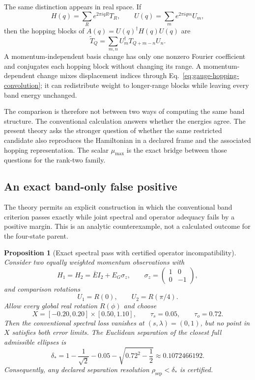 \documentclass[11pt]{article}
\newtheorem{proposition}[theorem]{Proposition}
\begin{document}
The same distinction appears in real space. If
\[
 H(q)=\sum_R e^{2\pi iqR}T_R,
 \qquad
 U(q)=\sum_m e^{2\pi iqm}U_m,
\]
then the hopping blocks of $A(q)=U(q)^\dagger H(q)U(q)$ are
\begin{equation}
 \widetilde T_Q=
 \sum_{m,n}U_m^\dagger T_{Q+m-n}U_n.
 \label{eq:gauge-hopping-convolution}
\end{equation}
A momentum-independent basis change has only one nonzero Fourier coefficient and
conjugates each hopping block without changing its range. A momentum-dependent change
mixes displacement indices through Eq.~\eqref{eq:gauge-hopping-convolution}; it can
redistribute weight to longer-range blocks while leaving every band energy unchanged.

The comparison is therefore not between two ways of computing the same band structure.
The conventional calculation answers whether the energies agree. The present theory
asks the stronger question of whether the same restricted candidate also reproduces the
Hamiltonian in a declared frame and the associated hopping representation. The scalar
$\mu_{\max}$ is the exact bridge between those questions for the rank-two family.

\subsection{An exact band-only false positive}

The theory permits an explicit construction in which the conventional band criterion
passes exactly while joint spectral and operator adequacy fails by a positive margin.
This is an analytic counterexample, not a calculated outcome for the four-state parent.

\begin{proposition}[Exact spectral pass with certified operator incompatibility]
\label{prop:constructed-fail}
Consider two equally weighted momentum observations with
\[
 H_1=H_2=\bar E I_2+E_G\sigma_z,
 \qquad
 \sigma_z=\begin{pmatrix}1&0\\0&-1\end{pmatrix},
\]
and comparison rotations
\[
 U_1=R(0),
 \qquad
 U_2=R(\pi/4).
\]
Allow every global real rotation $R(\phi)$ and choose
\[
 X=[-0.20,0.20]\times[0.50,1.10],
 \qquad
 \tau_s=0.05,
 \qquad
 \tau_o=0.72.
\]
Then the conventional spectral loss vanishes at $(s,\lambda)=(0,1)$, but no point in
$X$ satisfies both error limits. The Euclidean separation of the closest full
admissible ellipses is
\begin{equation}
 \delta_*
 =1-\frac{1}{\sqrt2}-0.05
  -\sqrt{0.72^2-\frac12}
 \approx0.1072466192.
 \label{eq:constructed-fail-distance}
\end{equation}
Consequently, any declared separation resolution
$\rho_{\mathrm{sep}}<\delta_*$ is certified.
\end{proposition}
\end{document}
